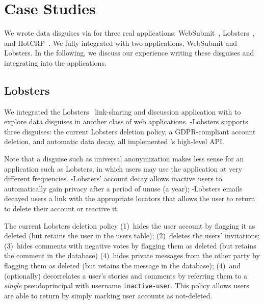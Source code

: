 \section{Case Studies}
\label{s:case-studies}

%
We wrote data disguises via \sys for three real applications:
WebSubmit~\cite{websubmit-rs-anon}, Lobsters~\cite{lobsters}, and HotCRP~\cite{hotcrp}.
%
We fully integrated \sys with two applications, WebSubmit and Lobsters.
%
In the following, we discuss our experience writing these disguises and integrating
\sys into the applications.
%

\subsection{Lobsters}

We integrated the Lobsters~\cite{lobsters} link-sharing and discussion application with \sys to
explore data disguises in another class of web applications. \sys-Lobsters supports three disguises:
the current Lobsters deletion policy, a GDPR-compliant account deletion, and automatic
data decay, all implemented \sys's high-level API.

Note that a disguise such as universal anonymization makes less sense for an application such as
Lobsters, in which users may use the application at very different frequencies.  \sys-Lobsters'
account decay allows inactive users to automatically gain privacy after a period of unuse (\eg a
year); \sys-Lobsters emails decayed users a link with the appropriate locators that allows the user
to return to delete their account or reactive it.

The current Lobsters deletion policy
%
(1)~hides the user account by flagging it as deleted (but retains the user in the users table);
%
(2)~deletes the users' invitations;
%
(3)~hides comments with negative votes by flagging them as deleted (but retains the comment in the database)
%
(4)~hides private messages from the other party by flagging them as deleted (but retains the message
in the database);
%
(4)~and (optionally) decorrelates a user's stories and comments by referring them
to a \emph{single} pseudoprincipal with username \texttt{inactive-user}.
%
This policy allows users are able to return by simply marking user accounts as not-deleted.

